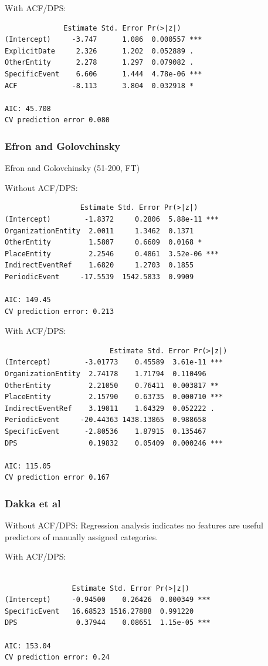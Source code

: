 \documentclass{sig-alternate}
\begin{document}
With ACF/DPS:
\begin{verbatim}
              Estimate Std. Error Pr(>|z|)    
(Intercept)     -3.747      1.086  0.000557 ***
ExplicitDate     2.326      1.202  0.052889 .  
OtherEntity      2.278      1.297  0.079082 .  
SpecificEvent    6.606      1.444  4.78e-06 ***
ACF             -8.113      3.804  0.032918 *  

AIC: 45.708
CV prediction error 0.080
\end{verbatim}

\subsubsection{Efron and Golovchinsky}


Efron and Golovchinsky (51-200, FT)

Without ACF/DPS:
\begin{verbatim}
                  Estimate Std. Error Pr(>|z|)    
(Intercept)        -1.8372     0.2806  5.88e-11 ***
OrganizationEntity  2.0011     1.3462  0.1371    
OtherEntity         1.5807     0.6609  0.0168 *  
PlaceEntity         2.2546     0.4861  3.52e-06 ***
IndirectEventRef    1.6820     1.2703  0.1855    
PeriodicEvent     -17.5539  1542.5833  0.9909    

AIC: 149.45
CV prediction error: 0.213
\end{verbatim}

With ACF/DPS:
\begin{verbatim}
                         Estimate Std. Error Pr(>|z|)    
(Intercept)        -3.01773    0.45589  3.61e-11 ***
OrganizationEntity  2.74178    1.71794  0.110496    
OtherEntity         2.21050    0.76411  0.003817 ** 
PlaceEntity         2.15790    0.63735  0.000710 ***
IndirectEventRef    3.19011    1.64329  0.052222 .  
PeriodicEvent     -20.44363 1438.13865  0.988658    
SpecificEvent      -2.80536    1.87915  0.135467    
DPS                 0.19832    0.05409  0.000246 ***

AIC: 115.05
CV prediction error 0.167
\end{verbatim}


\subsubsection{Dakka et al}

Without ACF/DPS: Regression analysis indicates no features are useful predictors of manually assigned categories.


With ACF/DPS:
\begin{verbatim}

                Estimate Std. Error Pr(>|z|)    
(Intercept)     -0.94500    0.26426  0.000349 ***
SpecificEvent   16.68523 1516.27888  0.991220    
DPS              0.37944    0.08651  1.15e-05 ***

AIC: 153.04
CV prediction error: 0.24
\end{verbatim}
\end{document}
